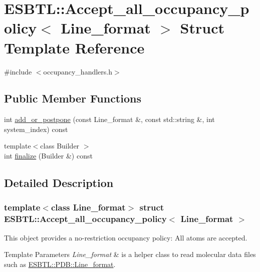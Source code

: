 \hypertarget{structESBTL_1_1Accept__all__occupancy__policy}{}\section{E\+S\+B\+TL\+:\+:Accept\+\_\+all\+\_\+occupancy\+\_\+policy$<$ Line\+\_\+format $>$ Struct Template Reference}
\label{structESBTL_1_1Accept__all__occupancy__policy}


{\ttfamily \#include $<$occupancy\+\_\+handlers.\+h$>$}

\subsection*{Public Member Functions}
\begin{DoxyCompactItemize}
\item 
int \hyperlink{structESBTL_1_1Accept__all__occupancy__policy_a46d98fd520cace8a53c90df99f75764a}{add\+\_\+or\+\_\+postpone} (const Line\+\_\+format \&, const std\+::string \&, int system\+\_\+index) const
\item 
{\footnotesize template$<$class Builder $>$ }\\int \hyperlink{structESBTL_1_1Accept__all__occupancy__policy_a71901c20a359729f33eddc04a1e84354}{finalize} (Builder \&) const
\end{DoxyCompactItemize}


\subsection{Detailed Description}
\subsubsection*{template$<$class Line\+\_\+format$>$\newline
struct E\+S\+B\+T\+L\+::\+Accept\+\_\+all\+\_\+occupancy\+\_\+policy$<$ Line\+\_\+format $>$}

This object provides a no-\/restriction occupancy policy\+: All atoms are accepted. 
\begin{DoxyTemplParams}{Template Parameters}
{\em Line\+\_\+format} & is a helper class to read molecular data files such as \hyperlink{classESBTL_1_1PDB_1_1Line__format}{E\+S\+B\+T\+L\+::\+P\+D\+B\+::\+Line\+\_\+format}. \\
\hline
\end{DoxyTemplParams}


